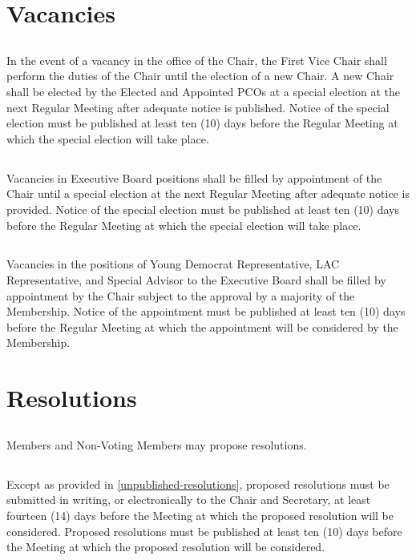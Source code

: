\section{Vacancies}
\subsection{}
In the event of a vacancy in the office of the Chair, the First Vice Chair shall perform the duties of the Chair until the election of a new Chair. A new Chair shall be elected by the Elected and Appointed PCOs at a special election at the next Regular Meeting after adequate notice is published. Notice of the special election must be published at least ten (10) days before the Regular Meeting at which the special election will take place.

\subsection{}
Vacancies in Executive Board positions shall be filled by appointment of the Chair until a special election at the next Regular Meeting after adequate notice is provided. Notice of the special election must be published at least ten (10) days before the Regular Meeting at which the special election will take place.

\subsection{}
Vacancies in the positions of Young Democrat Representative, LAC Representative, and Special Advisor to the Executive Board shall be filled by appointment by the Chair subject to the approval by a majority of the Membership. Notice of the appointment must be published at least ten (10) days before the Regular Meeting at which the appointment will be considered by the Membership.

\section{Resolutions}
\subsection{}
Members and Non-Voting Members may propose resolutions.

\subsection{}
Except as provided in \autoref{unpublished-resolutions}, proposed resolutions must be submitted in writing, or electronically to the Chair and Secretary, at least fourteen (14) days before the Meeting at which the proposed resolution will be considered. Proposed resolutions must be published at least ten (10) days before the Meeting at which the proposed resolution will be considered.

